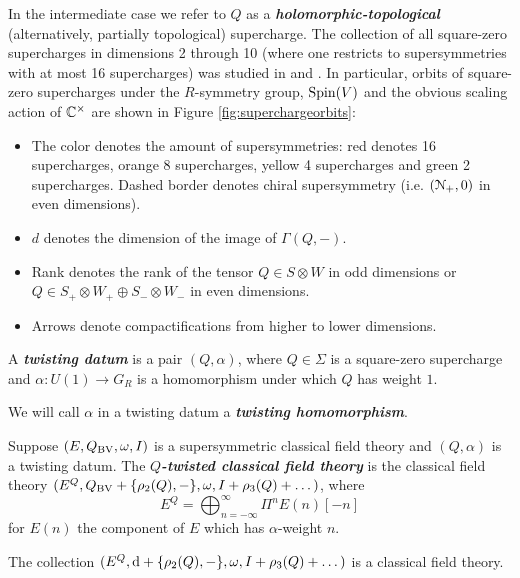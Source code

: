 \documentclass[10pt, oneside]{article}
\newcommand{\defterm}[1]{\textbf{\emph{#1}}}
\begin{document}
In the intermediate case we refer to $Q$ as a \defterm{holomorphic-topological} (alternatively, partially topological) supercharge. The collection of all square-zero supercharges in dimensions 2 through 10 (where one restricts to supersymmetries with at most 16 supercharges) was studied in \cite{ElliottSafronov} and \cite{EagerSaberiWalcher}. In particular, orbits of square-zero supercharges under the $R$-symmetry group, $\mathrm{Spin}(V)$ and the obvious scaling action of $\mathbb C^\times$ are shown in Figure \ref{fig:superchargeorbits}:
\begin{itemize}
\item The color denotes the amount of supersymmetries: red denotes 16 supercharges, orange 8 supercharges, yellow 4 supercharges and green 2 supercharges. Dashed border denotes chiral supersymmetry (i.e. $(\mathcal N_+, 0)$ in even dimensions).

\item $d$ denotes the dimension of the image of $\Gamma(Q, -)$.

\item Rank denotes the rank of the tensor $Q\in S\otimes W$ in odd dimensions or $Q\in S_+\otimes W_+\oplus S_-\otimes W_-$ in even dimensions.

\item Arrows denote compactifications from higher to lower dimensions.
\end{itemize}

\begin{definition}
A \defterm{twisting datum} is a pair $(Q, \alpha)$, where $Q\in\Sigma$ is a square-zero supercharge and $\alpha\colon U(1)\rightarrow G_R$ is a homomorphism under which $Q$ has weight $1$.
\end{definition}

We will call $\alpha$ in a twisting datum a \defterm{twisting homomorphism}.

\begin{definition} \label{def:twisting}
Suppose $(E, Q_{\mathrm{BV}}, \omega, I)$ is a supersymmetric classical field theory and $(Q, \alpha)$ is a twisting datum. The \defterm{$Q$-twisted classical field theory} is the classical field theory $(E^Q, Q_{\mathrm{BV}} + \{\rho_2(Q), -\}, \omega, I + \rho_3(Q) + \dots)$, where
\[E^Q = \bigoplus_{n=-\infty}^\infty \Pi^n E(n)[-n]\]
for $E(n)$ the component of $E$ which has $\alpha$-weight $n$.
\end{definition}

\begin{prop}
The collection $(E^Q, {\rm d} + \{\rho_2(Q), -\}, \omega, I + \rho_3(Q) + \dots)$ is a classical field theory.
\end{prop}
\end{document}
